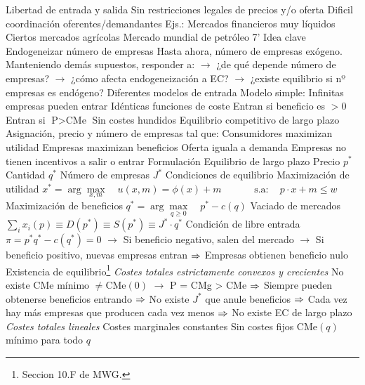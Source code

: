 \documentclass{nuevotema}
\begin{document}
\begin{esquemal}
				\4[] Libertad de entrada y salida
				\4[] Sin restricciones legales de precios y/o oferta
				\4[] Dificil coordinación oferentes/demandantes
				\4 Ejs.:
				\4[] Mercados financieros muy líquidos
				\4[] Ciertos mercados agrícolas
				\4[] Mercado mundial de petróleo
	\1  7'
		\2 Idea clave
			\3 Endogeneizar número de empresas
				\4 Hasta ahora, número de empresas exógeno.
				\4 Manteniendo demás supuestos, responder a:
				\4[] $\to$ ¿de qué depende número de empresas?
				\4[] $\to$ ¿cómo afecta endogeneización a EC?
				\4[] $\to$ ¿existe equilibrio si nº empresas es endógeno?
			\3 Diferentes modelos de entrada
				\4 Modelo simple:
				\4[$\to$] Infinitas empresas pueden entrar
				\4[$\to$] Idénticas funciones de coste
				\4[$\to$] Entran si beneficio es $>0$
				\4[$\then$] Entran si $\text{P} > \text{CMe}$
				\4[$\to$] Sin costes hundidos
			\3 Equilibrio competitivo de largo plazo
				\4 Asignación, precio y número de empresas tal que:
				\4[] Consumidores maximizan utilidad
				\4[] Empresas maximizan beneficios
				\4[] Oferta iguala a demanda
				\4[] Empresas no tienen incentivos a salir o entrar
		\2 Formulación
			\3 Equilibrio de largo plazo
				\4 Precio $p^*$
				\4 Cantidad $q^*$
				\4 Número de empresas $J^*$
			\3 Condiciones de equilibrio
				\4[(i)] Maximización de utilidad
				\4[] $x^* = \arg \underset{x,m}{\max} \quad u(x,m) = \phi(x) + m$
				\4[] $\quad \quad \quad \text{s.a}: \quad p \cdot x + m \leq w $
				\4[(ii)] Maximización de beneficios
				\4[] $q^* = \arg \underset{q \geq 0}{\max}\quad  p^* - c(q)$
				\4[(iii)] Vaciado de mercados
				\4[] $\sum_i x_i(p) \equiv  D(p^*) \equiv S(p^*) \equiv J^* \cdot q^*$
				\4[(iv)] Condición de libre entrada
				\4[] $\pi = p^* q^* - c( q^* ) = 0 $
				\4[] $\to$ Si beneficio negativo, salen del mercado
				\4[] $\to$ Si beneficio positivo, nuevas empresas entran
				\4[] $\then$ Empresas obtienen beneficio nulo
			\3 Existencia de equilibrio\footnote{Seccion 10.F de MWG.}
				\4 \textit{Costes totales estrictamente convexos y crecientes}
				\4[] No existe CMe mínimo $\neq \text{CMe}(0)$
				\4[] $\to$ P = CMg > CMe
				\4[] $\then$ Siempre pueden obtenerse beneficios entrando
				\4[] $\then$ No existe $J^*$ que anule beneficios
				\4[] $\then$ Cada vez hay más empresas que producen cada vez menos
				\4[] $\then$ No existe EC de largo plazo
				\4[] 
				\4 \textit{Costes totales lineales}
				\4[] Costes marginales constantes
				\4[] Sin costes fijos
				\4[] $\text{CMe}(q)$ mínimo para todo $q$

\end{esquemal}
\end{document}
